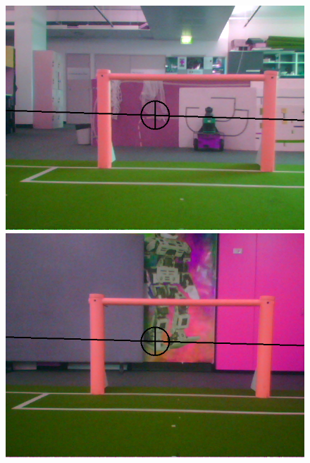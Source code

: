 \documentclass[runningheads,a4paper]{llncs}
\begin{document}
\begin{figure} [h]
\begin{minipage}[b]{0.5\textwidth}
\centering
\includegraphics[width=1\textwidth]{figures/img28.png}
\end{minipage}
\begin{minipage}[b]{0.5\textwidth}
\centering
\includegraphics[width=1\textwidth]{figures/img27.png}
\end{minipage}
\begin{minipage}[b]{0.5\textwidth}
\centering

\end{minipage}
\end{figure}
\end{document}
